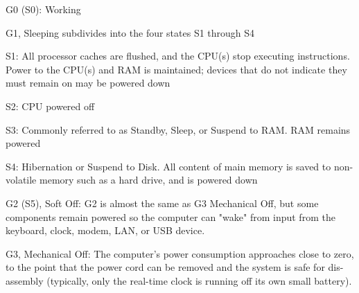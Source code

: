 {
\bi
  \item G0 (S0): Working
  \item G1, Sleeping subdivides into the four states S1 through S4 
     \bi
	\item S1: All processor caches are flushed, and the CPU(s) stop executing instructions. 
	Power to the CPU(s) and RAM is maintained; devices that do not indicate
	 they must remain on may be powered down
	\item S2: CPU powered off
	\item S3: Commonly referred to as Standby, Sleep, or Suspend to RAM. RAM  remains powered
	\item S4: Hibernation or Suspend to Disk. 
	All content of main memory is saved to non-volatile memory such as a hard drive, and is powered down
     \ei
  \item G2 (S5), Soft Off: G2 is almost the same as G3 Mechanical Off, 
  but some components remain powered so the computer can 
  "wake" from input from the keyboard, clock, modem, LAN, or USB device.
  \item G3, Mechanical Off: The computer's power consumption approaches close to zero, 
  to the point that the power cord can be removed and the system is safe for dis-assembly 
  (typically, only the real-time clock is running off its own small battery).
\ei
}
